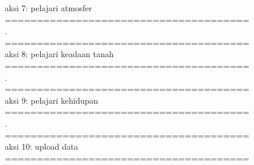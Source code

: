 aksi 7: pelajari atmosfer\\
======================================\\
.\\
======================================\\
aksi 8: pelajari keadaan tanah\\
======================================\\
.\\
======================================\\
aksi 9: pelajari kehidupan\\
======================================\\
.\\
======================================\\
aksi 10: upload data\\
======================================\\
